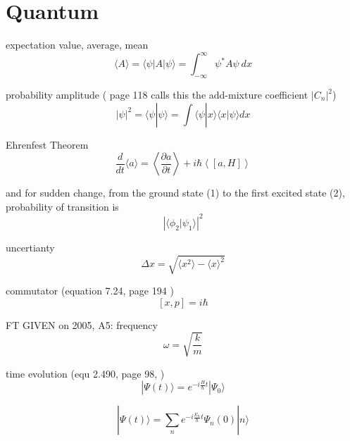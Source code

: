 \documentclass[12pt]{article}  %
\newcommand{\pfrac}[2]{\frac{\partial #1}{\partial #2}}
\def\qualifyingyear{F}
\begin{document}
\section{Quantum}

expectation value, average, mean
\begin{equation}
\langle A \rangle = \langle \psi | A | \psi \rangle = \int_{-\infty}^{\infty} \psi^* A \psi \ dx
\end{equation}

probability amplitude ( \cite{LiboffQM} page 118 calls this the 
add-mixture coefficient $|C_n|^2$)
\begin{equation}
| \psi | ^2 = \langle \psi | \psi \rangle = \int \langle \psi | x \rangle \langle x | \psi \rangle dx
\end{equation}

Ehrenfest Theorem
\begin{equation}
 \frac{d}{dt} \langle a\rangle = \left\langle \pfrac{a}{t} \right\rangle + i \hbar \left\langle [a,H] \right\rangle
\end{equation}

and for sudden change, from the ground state (1) to the first excited state (2), probability of transition is
\begin{equation}
\left| \langle \phi_2 | \psi_1 \rangle \right| ^2
\end{equation}

uncertianty
\begin{equation}
\Delta x = \sqrt{ \langle x^2 \rangle - \langle x \rangle ^2 }
\end{equation}

commutator (equation 7.24, page 194 \cite{LiboffQM})
\begin{equation}
\left[ x,p\right] =i\hbar 
\end{equation}

\if\qualifyingyear T
GIVEN on 2005, A5: 
\fi
frequency 
\begin{equation}
  \omega = \sqrt{\frac{k}{m}}
	\label{eq:frequency_wavenum}
\end{equation}

time evolution (equ 2.490, page 98, \cite{ParrisQM})
\begin{equation}
  |\Psi (t)\rangle = e^{-i \frac{H}{\hbar} t} |\Psi_0\rangle
\end{equation}

\begin{equation}
  |\Psi (t)\rangle = \sum_n e^{-i \frac{E_n}{\hbar} t} \Psi_n(0) |n\rangle
\end{equation}
\end{document}
